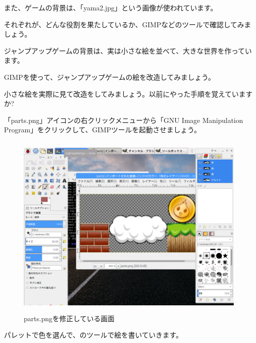 また、ゲームの背景は、「yama2.jpg」という画像が使われています。

それぞれが、どんな役割を果たしているか、GIMPなどのツールで確認してみましょう。



\begin{description}
    \item {}
\end{description}



ジャンプアップゲームの背景は、実は小さな絵を並べて、大きな世界を作っています。

GIMPを使って、ジャンプアップゲームの絵を改造してみましょう。

小さな絵を実際に見て改造をしてみましょう。以前にやった手順を覚えていますか?

「parts.png」アイコンの右クリックメニューから「GNU Image Manipulation Program」をクリックして、GIMPツールを起動させましょう。


\begin{figure}[H]
    \begin{center}
      \includegraphics[keepaspectratio,width=12.065cm,height=9.049cm]{text04-img/text04-img029.png}
      \caption{parts.pngを修正している画面}
    \end{center}
    \label{fig:prog_menu}
\end{figure}

パレットで色を選んで、のツールで絵を書いていきます。


